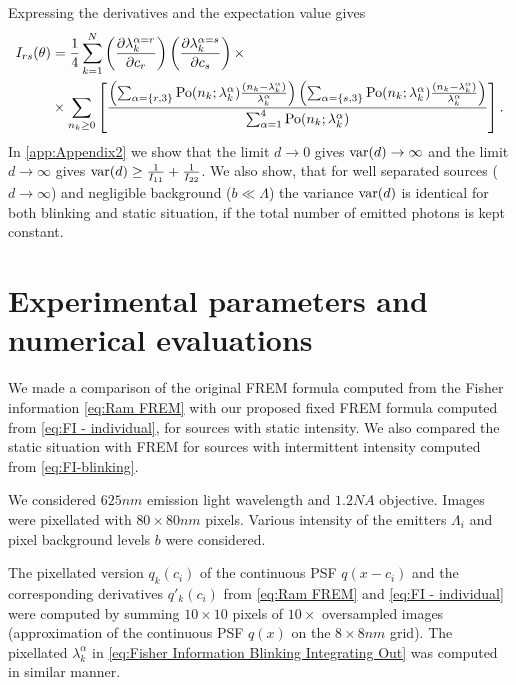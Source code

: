 Expressing the derivatives and the expectation value gives
%
\begin{alignat}{2}
	I_{rs}(\theta)
	&=\frac{1}{4}\sum_{k=1}^N\left(\frac{\partial\lambda_k^{\alpha=r}}{\partial c_r}\right)\left(\frac{\partial\lambda_k^{\alpha=s}}{\partial c_s}\right)\times \nonumber\\
	&\times \sum_{n_k\geq0}\left[\frac{\left(\sum_{\alpha=\{r,3\}}\mathrm{Po}(n_k;\lambda_k^\alpha)\frac{(n_k-\lambda_k^\alpha)}{\lambda_k^\alpha}\right)\left(\sum_{\alpha=\{s,3\}}\mathrm{Po}(n_k;\lambda_k^\alpha)\frac{(n_k-\lambda_k^\alpha)}{\lambda_k^\alpha}\right)}{\sum_{\alpha=1}^4\mathrm{Po}(n_k;\lambda_k^\alpha)}\right].
	\label{eq:FI-blinking}
\end{alignat}
%
In \autoref{app:Appendix2} we show that the limit $d\rightarrow0$ gives $\mathrm{var}(d)\rightarrow\infty$ and the limit $d\rightarrow\infty$ gives $\mathrm{var}(d)\geq\frac{1}{I_{11}}+\frac{1}{I_{22}}$. We also show, that for well separated sources ($d\rightarrow\infty$) and negligible background ($b\ll\Lambda$) the variance $\mathrm{var}(d)$ is identical for both blinking and static situation, if the total number of emitted photons is kept constant. 

\clearpage
\section{Experimental parameters and numerical evaluations\label{sec:FREM simulations}} 
We made a comparison of the original FREM formula computed from the Fisher information \autoref{eq:Ram FREM} with our proposed fixed FREM formula computed from \autoref{eq:FI - individual}, for sources with static intensity. We also compared the static situation with FREM for sources with intermittent intensity computed from \autoref{eq:FI-blinking}.

We considered $625\unit{nm}$ emission light wavelength and $1.2\unit{NA}$ objective. Images were pixellated with $80\times80\unit{nm}$ pixels. Various intensity of the emitters $\Lambda_i$ and pixel background levels $b$ were considered.

The pixellated version $q_k(c_i)$ of the continuous PSF $q(x-c_i)$ and the corresponding derivatives $q'_k(c_i)$ from \autoref{eq:Ram FREM} and \autoref{eq:FI - individual} were computed by summing $10\times10$ pixels of $10\times$ oversampled images (approximation of the continuous PSF $q(x)$ on the $8\times8 \unit{nm}$ grid). The pixellated $\lambda^\alpha_k$ in \autoref{eq:Fisher Information Blinking Integrating Out} was computed in similar manner. 

